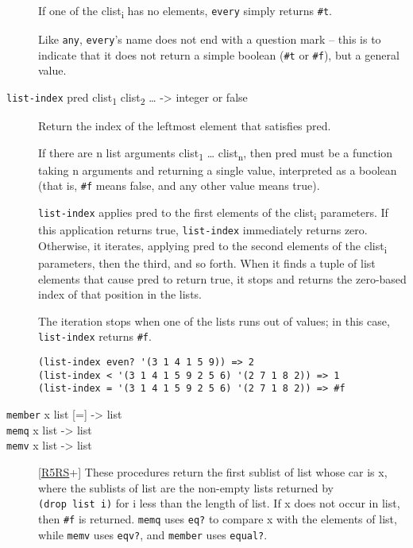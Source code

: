 \begin{description}
If one of the clist\textsubscript{i} has no elements, \texttt{every}
simply returns \texttt{\#t}.

Like \texttt{any}, \texttt{every}'s name does not end with a question
mark -- this is to indicate that it does not return a simple boolean
(\texttt{\#t} or \texttt{\#f}), but a general value.
\item[ \href{}{} \texttt{list-index} pred clist\textsubscript{1}
clist\textsubscript{2} \ldots{} -\textgreater{} integer or false ]
Return the index of the leftmost element that satisfies pred.

If there are n list arguments clist\textsubscript{1} \ldots{}
clist\textsubscript{n}, then pred must be a function taking n arguments
and returning a single value, interpreted as a boolean (that is,
\texttt{\#f} means false, and any other value means true).

\texttt{list-index} applies pred to the first elements of the
clist\textsubscript{i} parameters. If this application returns true,
\texttt{list-index} immediately returns zero. Otherwise, it iterates,
applying pred to the second elements of the clist\textsubscript{i}
parameters, then the third, and so forth. When it finds a tuple of list
elements that cause pred to return true, it stops and returns the
zero-based index of that position in the lists.

The iteration stops when one of the lists runs out of values; in this
case, \texttt{list-index} returns \texttt{\#f}.

\begin{verbatim}
(list-index even? '(3 1 4 1 5 9)) => 2
(list-index < '(3 1 4 1 5 9 2 5 6) '(2 7 1 8 2)) => 1
(list-index = '(3 1 4 1 5 9 2 5 6) '(2 7 1 8 2)) => #f
\end{verbatim}
\item[ \href{}{} \texttt{member} x list {[}={]} -\textgreater{} list\\
\href{}{} \texttt{memq} x list -\textgreater{} list\\
\href{}{} \texttt{memv} x list -\textgreater{} list ]
{[}\protect\hyperlink{R5RS}{R5RS}+{]} These procedures return the first
sublist of list whose car is x, where the sublists of list are the
non-empty lists returned by \texttt{(drop\ list\ i)} for i less than the
length of list. If x does not occur in list, then \texttt{\#f} is
returned. \texttt{memq} uses \texttt{eq?} to compare x with the elements
of list, while \texttt{memv} uses \texttt{eqv?}, and \texttt{member}
uses \texttt{equal?}.


\end{description}
